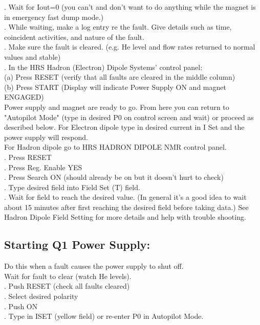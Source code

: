 {. Wait for Iout=0 (you can't and don't want to do anything while the magnet is in emergency fast dump mode.)\\
. While waiting, make a log entry re the fault. Give details such as time, coincident activities, and nature of the fault.\\
. Make sure the fault is cleared. (e.g. He level and flow rates returned to normal values and stable)\\
. In the HRS Hadron (Electron) Dipole Systems' control panel:\\
\noindent(a) Press RESET (verify that all faults are cleared in the middle column)\\
\noindent(b) Press START (Display will indicate Power Supply ON and magnet ENGAGED)\\

Power supply and magnet are ready to go. From here you can return
to "Autopilot Mode" 
(type in desired P0 on control screen and wait) or proceed as described below.
For Electron dipole type in desired current in I Set and the power supply will respond.\\ 
For Hadron dipole go to HRS HADRON DIPOLE NMR control panel.\\

. Press RESET\\
. Press Reg. Enable YES\\
. Press Search ON (should already be on but it doesn't hurt to check)\\
. Type desired field into Field Set (T) field.\\
. Wait for field to reach the desired value. (In general it's a good idea to wait about 15 minutes after first reaching
 the desired field before taking data.) See Hadron Dipole Field Setting for more details and help with trouble shooting.\\

\subsection{Starting Q1 Power Supply:}
\noindent Do this when a fault causes the power supply to shut off.\\
\noindent Wait for fault to clear (watch He levels). \\
. Push RESET (check all faults cleared)\\
. Select desired polarity\\
. Push ON\\
. Type in ISET (yellow field) or re-enter P0 in Autopilot Mode.\\

}
